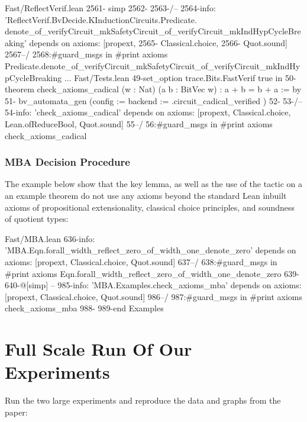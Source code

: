 \documentclass[acmlarge, nonacm]{acmart}
\begin{document}
\begin{script}
Fast/ReflectVerif.lean
2561-    simp
2562-
2563-/--
2564-info: 'ReflectVerif.BvDecide.KInductionCircuits.Predicate. denote_of_verifyCircuit_mkSafetyCircuit_of_verifyCircuit_mkIndHypCycleBreaking' depends on axioms: [propext,
2565- Classical.choice,
2566- Quot.sound]
2567--/
2568:#guard_msgs in #print axioms Predicate.denote_of_verifyCircuit_mkSafetyCircuit_of_verifyCircuit_mkIndHypCycleBreaking
...
Fast/Tests.lean
49-set_option trace.Bits.FastVerif true in
50-theorem check_axioms_cadical (w : Nat) (a b : BitVec w) : a + b = b + a := by
51-  bv_automata_gen (config := {backend := .circuit_cadical_verified} )
52-
53-/--
54-info: 'check_axioms_cadical' depends on axioms: [propext, Classical.choice, Lean.ofReduceBool, Quot.sound]
55--/
56:#guard_msgs in #print axioms check_axioms_cadical
\end{script}


\subsubsection{MBA Decision Procedure}

The example below show that the key lemma,
as well as the use of the tactic on a an example theorem
do not use any axioms beyond the standard Lean inbuilt
axioms of propositional extensionality, classical choice principles, and soundness of quotient types:


\begin{script}
Fast/MBA.lean
636-info: 'MBA.Eqn.forall_width_reflect_zero_of_width_one_denote_zero' depends on axioms: [propext, Classical.choice, Quot.sound]
637--/
638:#guard_msgs in #print axioms Eqn.forall_width_reflect_zero_of_width_one_denote_zero
639-
640-@[simp]
--
985-info: 'MBA.Examples.check_axioms_mba' depends on axioms: [propext, Classical.choice, Quot.sound]
986--/
987:#guard_msgs in #print axioms check_axioms_mba
988-
989-end Examples
\end{script}



\section{Full Scale Run Of Our Experiments}

Run the two large experiments and reproduce the data and graphs from the paper:

\end{document}
